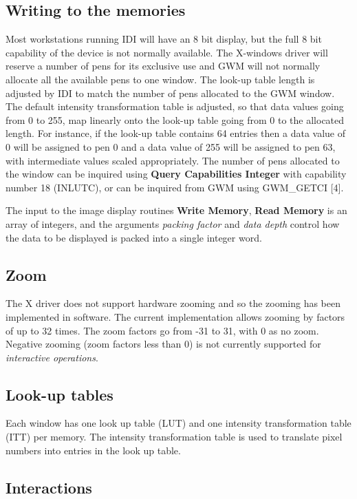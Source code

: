 \subsection{Writing to the memories}

Most workstations running IDI will have an 8 bit display, but the
full 8 bit capability of the device is not normally available. The
X-windows driver will reserve a number of pens for its exclusive use
and GWM will not normally allocate all the available pens to one
window. The look-up table length is adjusted by IDI to match the
number of pens allocated to the GWM window. The default intensity
transformation table is adjusted, so that data values going from 0 to
255, map linearly onto the look-up table going from 0 to the allocated
length. For instance, if the look-up table contains 64 entries then a data
value of 0 will be assigned to pen 0 and a data value of 255 will be assigned
to pen 63, with intermediate values scaled appropriately.
The number of pens allocated to the window can be inquired using
{\bf Query Capabilities Integer} with capability number 18 (INLUTC),
or can be inquired from GWM using GWM\_GETCI [4].

The input to the image display routines {\bf Write Memory}, {\bf Read Memory}
is an array of integers, and the arguments {\it packing factor} and
{\it data depth} control how the data to be displayed is packed into a
single integer word.

\subsection{Zoom}

The X driver does not support hardware zooming and so the zooming has
been implemented in software. The current implementation allows zooming
by factors of up to 32 times. The zoom factors go from -31 to 31, with
0 as no zoom. Negative zooming (zoom factors less than 0) is not
currently supported for {\it interactive operations}.

\subsection{Look-up tables}

Each window has one look up table (LUT) and one intensity transformation
table (ITT) per memory. The intensity transformation table is used to
translate pixel numbers into entries in the look up table.

\subsection{Interactions}

